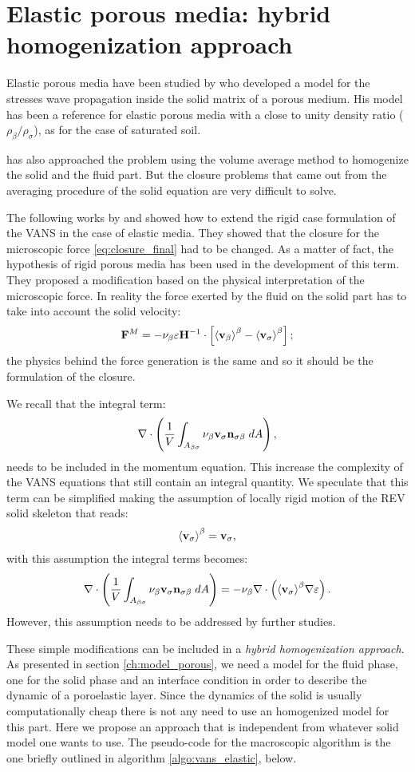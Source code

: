 \section{Elastic porous media: hybrid homogenization approach}
\label{ph:moving}

Elastic porous media have been studied by \citet{biot1956theory} who developed a model for the stresses wave propagation inside the solid matrix of a porous medium.
His model has been a reference for elastic porous media with a close to unity density ratio ($\rho_{\beta}/\rho_{\sigma}$), as for the case of saturated soil.

\citet{whitaker1986deformable} has also approached the problem using the volume average method to homogenize the solid and the fluid part.
But the closure problems that came out from the averaging procedure of the solid equation are very difficult to solve. 

The following works by \citet{hussong2011continuum} and \citet{wang2015volume} showed how to extend the rigid case formulation of the VANS in the case of elastic media.
They showed that the closure for the microscopic force \eqref{eq:closure_final} had to be changed. As a matter of fact, the hypothesis of rigid porous media has been used in the development of this term.
They proposed a modification based on the physical interpretation of the microscopic force. In reality the force exerted by the fluid on the solid part has to take into account the solid velocity:
$$
\mathbf{F}^M = - \nu_{\beta} \varepsilon \mathbf{H}^{-1} \cdot \left[ {\left< \textbf{v}_{\beta} \right>}^{\beta} - {\left< \textbf{v}_{\sigma} \right>}^{\beta} \right];
$$
the physics behind the force generation is the same and so it should be the formulation of the closure.

We recall that the integral term: $$\nabla \cdot \left( \dfrac{1}{V} \displaystyle\int_{A_{\beta \sigma}}  \nu_{\beta} \textbf{v}_{\sigma} \mathbf{n}_{\sigma \beta} \;dA \right),$$ needs to be included in the momentum equation. This increase the complexity of the VANS equations that still contain an integral quantity. We speculate that this term can be simplified making the assumption of locally rigid motion of the REV solid skeleton that reads:
$$
{\left< \textbf{v}_{\sigma} \right>}^{\beta} = \textbf{v}_{\sigma},
$$
\noindent with this assumption the integral terms becomes:
$$
\nabla \cdot \left( \dfrac{1}{V} \displaystyle\int_{A_{\beta \sigma}}  \nu_{\beta} \textbf{v}_{\sigma} \mathbf{n}_{\sigma \beta} \;dA \right) = - \nu_{\beta} \nabla \cdot \left( {\left< \textbf{v}_{\sigma} \right>}^{\beta} \nabla \varepsilon \right).
$$
However, this assumption needs to be addressed by further studies.

These simple modifications can be included in a \textit{hybrid homogenization approach}. As presented in section \ref{ch:model_porous}, we need a model for the fluid phase, one for the solid phase and an interface condition in order to describe the dynamic of a poroelastic layer. Since the dynamics of the solid is usually computationally cheap there is not any need to use an homogenized model for this part. Here we propose an approach that is independent from whatever solid model one wants to use. The pseudo-code for the macroscopic algorithm is the one briefly outlined in algorithm  \ref{algo:vans_elastic}, below.
\vspace{0.5cm}

